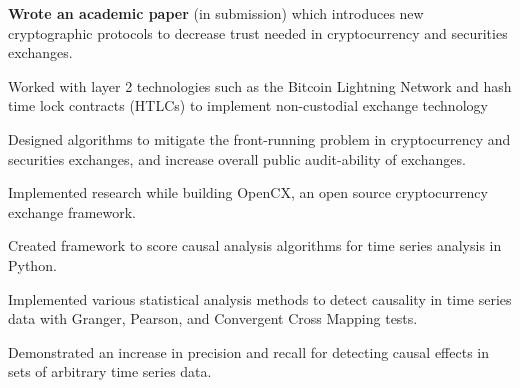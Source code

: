 
\begin{tightemize}
  \item \textbf{Wrote an academic paper} (in submission) which
      introduces new cryptographic protocols to decrease trust needed
      in cryptocurrency and securities exchanges.
  \item Worked with layer 2 technologies such as the Bitcoin Lightning
      Network and hash time lock contracts (HTLCs) to implement
      non-custodial exchange technology
  \item Designed algorithms to mitigate the front-running problem in
      cryptocurrency and securities exchanges, and increase overall
      public audit-ability of exchanges.
  \item Implemented research while building OpenCX, an open source
      cryptocurrency exchange framework.
\end{tightemize}
\subsectionsep

\begin{tightemize}
\item Created framework to score causal analysis algorithms for time
    series analysis in Python.
\item Implemented various statistical analysis methods to detect
    causality in time series data with Granger, Pearson, and
    Convergent Cross Mapping tests.
\item Demonstrated an increase in precision and recall for detecting
    causal effects in sets of arbitrary time series data.
\end{tightemize}
\subsectionsep

